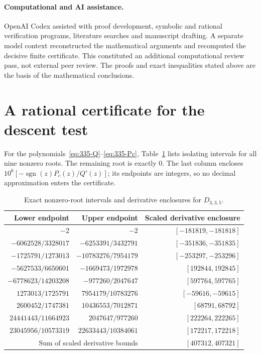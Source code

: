 \documentclass[11pt,a4paper]{article}
\theoremstyle{remark}
\DeclareMathOperator{\sgn}{sgn}
\begin{document}
\paragraph{Computational and AI assistance.}
OpenAI Codex assisted with proof development, symbolic and rational
verification programs, literature searches and manuscript drafting.
A separate model context reconstructed the mathematical arguments
and recomputed the decisive finite certificate. This constituted
an additional computational review pass, not external peer review.
The proofs and exact inequalities stated above are the basis of the
mathematical conclusions.

\appendix
\section{A rational certificate for the descent test}\label{app:certificate}

For the polynomials~\eqref{eq:335-Q}--\eqref{eq:335-Pc}, Table~\ref{tab:335}
lists isolating intervals for all nine nonzero roots. The remaining
root is exactly $0$. The last column encloses
$10^6[-\sgn(z)P_c(z)/Q'(z)]$; its endpoints are integers, so no
decimal approximation enters the certificate.

\begin{table}[htbp]
\centering
\small
\begin{tabular}{rrr}
\toprule
Lower endpoint & Upper endpoint & Scaled derivative enclosure\\
\midrule
$-2$ & $-2$ & $[-181819,-181818]$ \\
$-6062528/3328017$ & $-6253391/3432791$ & $[-351836,-351835]$ \\
$-1725791/1273013$ & $-10783276/7954179$ & $[-253297,-253296]$ \\
$-5627533/6650601$ & $-1669473/1972978$ & $[192844,192845]$ \\
$-6778623/14203208$ & $-977260/2047647$ & $[597764,597765]$ \\
$1273013/1725791$ & $7954179/10783276$ & $[-59616,-59615]$ \\
$2600452/1747381$ & $10436553/7012871$ & $[68791,68792]$ \\
$24441443/11664923$ & $2047647/977260$ & $[222264,222265]$ \\
$23045956/10573319$ & $22633443/10384061$ & $[172217,172218]$ \\
\midrule
\multicolumn{2}{r}{Sum of scaled derivative bounds} & $[407312,407321]$\\
\bottomrule
\end{tabular}
\caption{Exact nonzero-root intervals and derivative enclosures for $D_{3,3,5}$.}
\label{tab:335}
\end{table}
\end{document}
